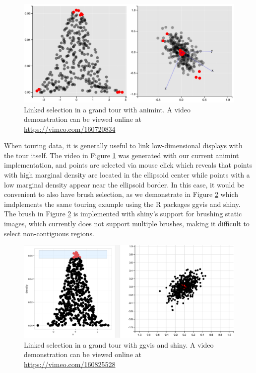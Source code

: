 \documentclass[12pt,]{article}
\theoremstyle{definition}
\theoremstyle{definition}
\theoremstyle{remark}
\begin{document}
\begin{figure}
\centering
\includegraphics{images/tour}
\caption{\label{fig:tour}Linked selection in a grand tour with animint. A
video demonstration can be viewed online at
\url{https://vimeo.com/160720834}}
\end{figure}

When touring data, it is generally useful to link low-dimensional
displays with the tour itself. The video in Figure \ref{fig:tour} was
generated with our current animint implementation, and points are
selected via mouse click which reveals that points with high marginal
density are located in the ellipsoid center while points with a low
marginal density appear near the ellipsoid border. In this case, it
would be convenient to also have brush selection, as we demonstrate in
Figure \ref{fig:tourbrush} which imdplements the same touring example
using the R packages ggvis and shiny. The brush in Figure
\ref{fig:tourbrush} is implemented with shiny's support for brushing
static images, which currently does not support multiple brushes, making
it difficult to select non-contiguous regions.

\begin{figure}
\centering
\includegraphics{images/tourbrush}
\caption{\label{fig:tourbrush}Linked selection in a grand tour with ggvis
and shiny. A video demonstration can be viewed online at
\url{https://vimeo.com/160825528}}
\end{figure}
\end{document}
